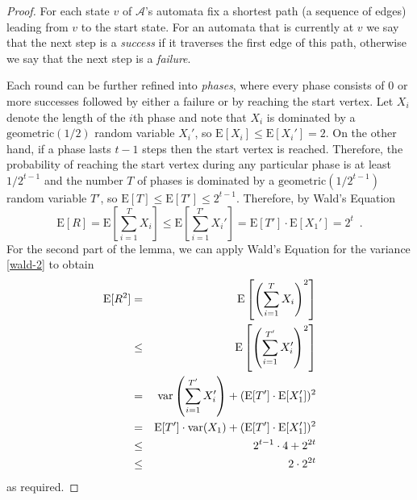 \documentclass[lotsofwhite]{patmorin}
\newcommand{\E}{\mathrm{E}}
\DeclareMathOperator{\var}{var}
\begin{document}
\begin{proof}
For each state $v$ of $\mathcal{A}$'s automata fix a shortest path (a
sequence of edges) leading from $v$ to the start state.  For an
automata that is currently at $v$ we say that the next step is a
\emph{success} if it traverses the first edge of this path, otherwise
we say that the next step is a \emph{failure}.

Each round can be further refined into \emph{phases}, where every
phase consists of 0 or more successes followed by either a failure or
by reaching the start vertex.  Let $X_i$ denote the length of the
$i$th phase and note that $X_i$ is dominated by a
$\mathrm{geometric}(1/2)$ random variable $X_i'$, so
$\E[X_i]\le\E[X_i'] = 2$.  On the other hand, if a phase lasts $t-1$
steps then the start vertex is reached.  Therefore, the probability of
reaching the start vertex during any particular phase is at least
$1/2^{t-1}$ and the number $T$ of phases is dominated by a
$\mathrm{geometric}(1/2^{t-1})$ random variable $T'$, so
$\E[T]\le\E[T']\le 2^{t-1}$.  Therefore, by Wald's Equation
\[
  \E[R] = \E\left[\sum_{i=1}^T X_i\right]\le \E\left[\sum_{i=1}^{T'}
X_i'\right] = \E[T']\cdot\E[X_1'] = 2^t \enspace .
\]
For the second part of the lemma, we can apply Wald's Equation for
the variance \eqref{wald-2} to
obtain
\begin{eqnarray*}
  \E[R^2] & = & \E\left[\left(\sum_{i=1}^T X_i\right)^2\right] \\
          &\le& \E\left[\left(\sum_{i=1}^{T'} X_i'\right)^2\right] \\
          & = & \var\left(\sum_{i=1}^{T'} X_i'\right) + (\E[T']\cdot\E[X_1'])^2 \\
          & = & \E[T']\cdot\var(X_1) + (\E[T']\cdot\E[X_1'])^2 \\
          & \le & 2^{t-1}\cdot 4 + 2^{2t} \\
          & \le & 2\cdot2^{2t}
\comment{
          & = & \E\left[\sum_{i=1}^{T'} (X_i')^2
                + \sum_{i=1}^{T'}\sum_{j=i+1}^{T'} 2X_i'X_j' \right] \\
          & = & \E\left[\sum_{i=1}^{T'} (X_i')^2\right]
                + \E\left[\sum_{i=1}^{T'}\sum_{j=i+1}^{T'} 2X_i'X_j'\right] \\
          & = & \E[T']\cdot \E\left[(X_i')^2\right]
                + \E\left[\sum_{i=1}^T\sum_{j=i+1}^{T'} 2X_i'X_j'\right] \\
          & = & \E[T']\cdot \E\left[(X_i')^2\right]
                + \E\left[\sum_{i=1}^T\sum_{j=i+1}^{T'} 2X_i'X_j'\right] \\

}
\end{eqnarray*}
as required.
\end{proof}
\end{document}
